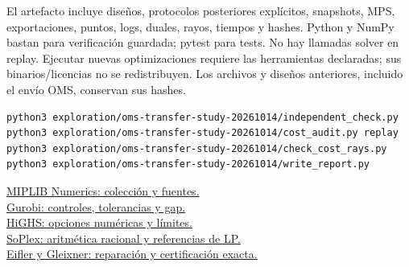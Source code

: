 \documentclass[10pt,a4paper]{article}
\begin{document}
El artefacto incluye diseños, protocolos posteriores explícitos, snapshots,
MPS, exportaciones, puntos, logs, duales, rayos, tiempos y hashes. Python y
NumPy bastan para verificación guardada; pytest para tests. No hay llamadas
solver en replay. Ejecutar nuevas optimizaciones requiere las herramientas
declaradas; sus binarios/licencias no se redistribuyen. Los archivos y
diseños anteriores, incluido el envío OMS, conservan sus hashes.
\begin{verbatim}
python3 exploration/oms-transfer-study-20261014/independent_check.py
python3 exploration/oms-transfer-study-20261014/cost_audit.py replay
python3 exploration/oms-transfer-study-20261014/check_cost_rays.py
python3 exploration/oms-transfer-study-20261014/write_report.py
\end{verbatim}
\small
\href{https://miplib.zib.de/tag_numerics.html}{MIPLIB Numerics: colección y fuentes.}\\
\href{https://docs.gurobi.com/projects/optimizer/en/current/reference/parameters.html}{Gurobi: controles, tolerancias y gap.}\\
\href{https://ergo-code.github.io/HiGHS/stable/options/definitions/}{HiGHS: opciones numéricas y límites.}\\
\href{https://soplex.zib.de/doc/html/EXACT.php}{SoPlex: aritmética racional y referencias de LP.}\\
\href{https://arxiv.org/abs/2101.09141}{Eifler y Gleixner: reparación y certificación exacta.}
\end{document}

